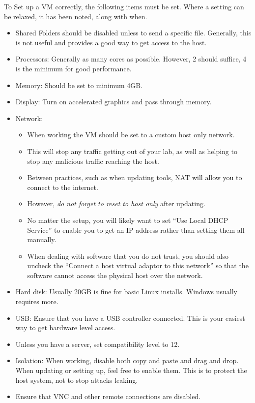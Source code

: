 \documentclass[a4paper,11pt]{report}
\begin{document}
				To Set up a VM correctly, the following items must be set. 
				Where a setting can be relaxed, it has been noted, along with when. 
				\begin{itemize}
					\item Shared Folders should be disabled unless to send a specific file. 
						Generally, this is not useful and provides a good way to get access to the host. 
					\item Processors: Generally as many cores as possible. However, 2 should suffice, 4 is the minimum for good performance. 
					\item Memory: Should be set to minimum 4GB. 
					\item Display: Turn on accelerated graphics and pass through memory. 
					\item Network:
						\begin{itemize}
							\item When working the VM should be set to a custom host only network. 
							\item This will stop any traffic getting out of your lab, as well as helping to stop any malicious traffic reaching the host. 
							\item Between practices, such as when updating tools, NAT will allow you to connect to the internet. 
							\item However, \emph{do not forget to reset to host only} after updating. 
							\item No matter the setup, you will likely want to set ``Use Local DHCP Service'' to enable you to get an IP address rather than setting them all manually. 
							\item When dealing with software that you do not trust, you should also uncheck the ``Connect a host virtual adaptor to this network'' so that the software cannot access the physical host over the network. 
						\end{itemize}
					\item Hard disk: Usually 20GB is fine for basic Linux installs. 
						Windows usually requires more. 
					\item USB: Ensure that you have a USB controller connected. 
						This is your easiest way to get hardware level access. 
					\item Unless you have a server, set compatibility level to 12. 
					\item Isolation: When working, disable both copy and paste and drag and drop. 
						When updating or setting up, feel free to enable them. 
						This is to protect the host system, not to stop attacks leaking. 
					\item Ensure that VNC and other remote connections are disabled. 
				\end{itemize}
\end{document}
